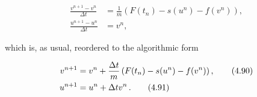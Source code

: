 \documentclass[11pt,a4paper]{article}
\author{Anoynmous}
\begin{document}
\begin{align} 
\frac{v^{n+1}-v^n}{\Delta t} &= \frac{1}{m}\left(F(t_n) - s(u^n) - f(v^n)\right), \tag{4.88}\\ \frac{u^{n+1}-u^n}{\Delta t} &= v^n, \tag{4.89} 
\end{align}  

which is, as usual, reordered to the algorithmic form  

\begin{align} 
v^{n+1} &= v^n + \frac{\Delta t}{m}\left(F(t_n) - s(u^n) - f(v^n)\right), 
\tag{4.90}\\ u^{n+1} &= u^n + \Delta t v^n\thinspace . \tag{4.91} 
\end{align} 
\end{document}
